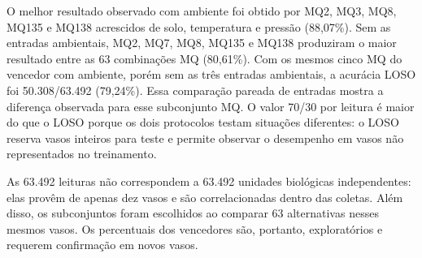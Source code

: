 O melhor resultado observado com ambiente foi obtido por MQ2, MQ3, MQ8,
MQ135 e MQ138 acrescidos de solo, temperatura e pressão (88,07\%). Sem as
entradas ambientais, MQ2, MQ7, MQ8, MQ135 e MQ138 produziram o maior
resultado entre as 63 combinações MQ (80,61\%). Com os mesmos cinco MQ do
vencedor com ambiente, porém sem as três entradas
ambientais, a acurácia LOSO foi 50.308/63.492 (79,24\%). Essa comparação
pareada de entradas mostra a diferença observada para esse subconjunto MQ.
O valor 70/30 por leitura é maior do que o LOSO porque os dois protocolos
testam situações diferentes: o LOSO reserva vasos inteiros para teste e
permite observar o desempenho em vasos não representados no treinamento.

As 63.492 leituras não correspondem a 63.492 unidades biológicas
independentes: elas provêm de apenas dez vasos e são correlacionadas dentro
das coletas. Além disso, os subconjuntos foram escolhidos ao comparar 63
alternativas nesses mesmos vasos. Os percentuais dos vencedores são,
portanto, exploratórios e requerem confirmação em novos vasos.
